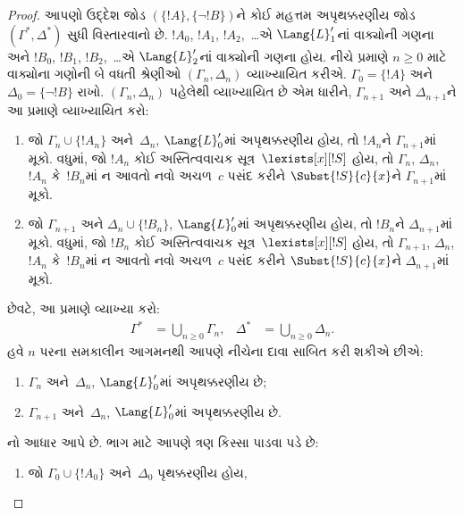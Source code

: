 \begin{proof}
આપણો ઉદ્દેશ જોડ $(\{ !A \}, \{\lnot!B\})$ને કોઈ મહત્તમ
અપૃથક્કરણીય જોડ $(\Gamma^*, \Delta^*)$ સુધી વિસ્તારવાનો છે.
$!A_0$, $!A_1$, $!A_2$,~\dots એ $\Lang{L}'_1$નાં વાક્યોની
ગણના અને $!B_0$, $!B_1$, $!B_2$,~\dots એ $\Lang{L}'_2$નાં
વાક્યોની ગણના હોય. નીચે પ્રમાણે $n\ge0$ માટે વાક્યોના
ગણોની બે વધતી શ્રેણીઓ $(\Gamma_n,\Delta_n)$ વ્યાખ્યાયિત કરીએ. $\Gamma_0
= \{!A\}$ અને $\Delta_0=\{\lnot !B\}$ રાખો. $(\Gamma_n,\Delta_n)$
પહેલેથી વ્યાખ્યાયિત છે એમ ધારીને, $\Gamma_{n+1}$ અને
$\Delta_{n+1}$ને આ પ્રમાણે વ્યાખ્યાયિત કરો:
\begin{enumerate}
\item જો $\Gamma_n \cup \{!A_n \}$ અને~$\Delta_n$, $\Lang{L}'_0$માં
  અપૃથક્કરણીય હોય, તો $!A_n$ને $\Gamma_{n+1}$માં મૂકો. વધુમાં, જો
  $!A_n$ કોઈ અસ્તિત્વવાચક સૂત્ર~$\lexists[x][!S]$ હોય, તો
  $\Gamma_n$, $\Delta_n$, $!A_n$ કે~$!B_n$માં ન આવતો નવો
  અચળ~$c$ પસંદ કરીને $\Subst{!S}{c}{x}$ને
  $\Gamma_{n+1}$માં મૂકો.
\item જો $\Gamma_{n+1}$ અને $\Delta_n \cup \{!B_n \}$,
  $\Lang{L}'_0$માં અપૃથક્કરણીય હોય, તો $!B_n$ને $\Delta_{n+1}$માં
  મૂકો. વધુમાં, જો $!B_n$ કોઈ અસ્તિત્વવાચક
  સૂત્ર~$\lexists[x][!S]$ હોય, તો $\Gamma_{n+1}$, $\Delta_n$,
  $!A_n$ કે~$!B_n$માં ન આવતો નવો અચળ~$c$ પસંદ કરીને
  $\Subst{!S}{c}{x}$ને $\Delta_{n+1}$માં મૂકો.
\end{enumerate}
છેવટે, આ પ્રમાણે વ્યાખ્યા કરો:
\begin{align*}
  \Gamma^* & = \bigcup_{n\ge 0} \Gamma_n, &
  \Delta^* & = \bigcup_{n\ge 0} \Delta_n.
\end{align*}
હવે $n$ પરના સમકાલીન આગમનથી આપણે નીચેના દાવા સાબિત કરી શકીએ છીએ:
\begin{enumerate}
\item{} $\Gamma_n$ અને~$\Delta_n$, $\Lang{L}'_0$માં
  અપૃથક્કરણીય છે;
\item{} $\Gamma_{n+1}$ અને~$\Delta_n$,
  $\Lang{L}'_0$માં અપૃથક્કરણીય છે.
\end{enumerate}
નો આધાર  આપે છે. ભાગ
 માટે આપણે ત્રણ કિસ્સા પાડવા પડે છે:
\begin{enumerate}
\item જો $\Gamma_0 \cup \{!A_0 \}$ અને~$\Delta_0$ પૃથક્કરણીય હોય,

\end{enumerate}
\end{proof}
